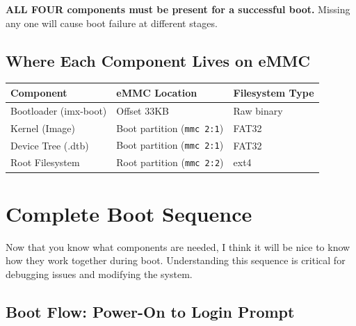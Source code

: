 \documentclass[12pt,a4paper]{report}
\begin{document}
\begin{important}
\textbf{ALL FOUR components must be present for a successful boot.} Missing any one will cause boot failure at different stages.
\end{important}

\subsection{Where Each Component Lives on eMMC}

\begin{center}
\begin{tabular}{|l|l|l|}
\hline
\textbf{Component} & \textbf{eMMC Location} & \textbf{Filesystem Type} \\
\hline
Bootloader (imx-boot) & Offset 33KB & Raw binary \\
Kernel (Image) & Boot partition (\texttt{mmc 2:1}) & FAT32 \\
Device Tree (.dtb) & Boot partition (\texttt{mmc 2:1}) & FAT32 \\
Root Filesystem & Root partition (\texttt{mmc 2:2}) & ext4 \\
\hline
\end{tabular}
\end{center}

\section{Complete Boot Sequence}

Now that you know what components are needed, I think it will be nice to know how they work together during boot. Understanding this sequence is critical for debugging issues and modifying the system.

\subsection{Boot Flow: Power-On to Login Prompt}
\end{document}
